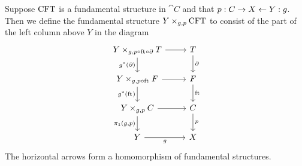 \begin{defn}
Suppose $\mathrm{CFT}$ is a fundamental structure in $\cat{C}$ and that 
$p:C\rightarrow X\leftarrow Y:g$.
Then we define the fundamental structure $\cobesys{Y}{\stesys}{g}{p}$ to consist
of the part of the left column above $Y$ in the diagram
\begin{equation*}
\begin{tikzcd}
\cobesys{Y}{\stesyst}{g}{p\circ\eft\circ\ebd}
  \ar{r}
  \ar{d}[swap]{g^\ast(\ebd)}
  &
\stesyst
  \ar{d}{\ebd}
  \\
\cobesys{Y}{\stesysf}{g}{p\circ\eft}
  \ar{r}
  \ar{d}[swap]{g^\ast(\eft)}
  &
\stesysf
  \ar{d}{\eft}
  \\
\cobesys{Y}{\stesysc}{g}{p}
  \ar{r}
  \ar{d}[swap]{\pullbackpr{1}{g}{p}}
  &
\stesysc
  \ar{d}{p}
  \\
Y \ar{r}[swap]{g}
  &
X
\end{tikzcd}
\end{equation*}
The horizontal arrows form a homomorphism
of fundamental structures.
\end{defn}
